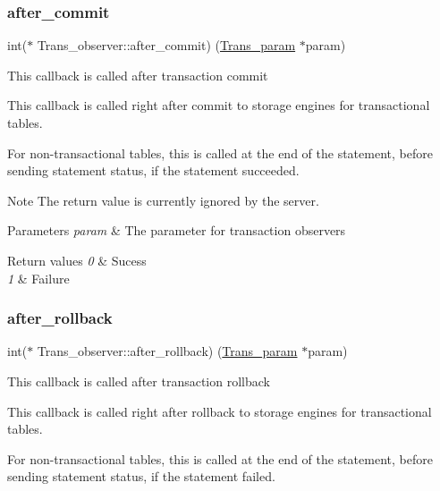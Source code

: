 \subsubsection{\texorpdfstring{after\+\_\+commit}{after\_commit}}
{\footnotesize\ttfamily int($\ast$ Trans\+\_\+observer\+::after\+\_\+commit) (\mbox{\hyperlink{structTrans__param}{Trans\+\_\+param}} $\ast$param)}

This callback is called after transaction commit

This callback is called right after commit to storage engines for transactional tables.

For non-\/transactional tables, this is called at the end of the statement, before sending statement status, if the statement succeeded.

\begin{DoxyNote}{Note}
The return value is currently ignored by the server.
\end{DoxyNote}

\begin{DoxyParams}{Parameters}
{\em param} & The parameter for transaction observers\\
\hline
\end{DoxyParams}

\begin{DoxyRetVals}{Return values}
{\em 0} & Sucess \\
\hline
{\em 1} & Failure \\
\hline
\end{DoxyRetVals}
\mbox{\label{structTrans__observer_aab173ceafec6271f6fcde43c32522306}} 
\subsubsection{\texorpdfstring{after\+\_\+rollback}{after\_rollback}}
{\footnotesize\ttfamily int($\ast$ Trans\+\_\+observer\+::after\+\_\+rollback) (\mbox{\hyperlink{structTrans__param}{Trans\+\_\+param}} $\ast$param)}

This callback is called after transaction rollback

This callback is called right after rollback to storage engines for transactional tables.

For non-\/transactional tables, this is called at the end of the statement, before sending statement status, if the statement failed.

